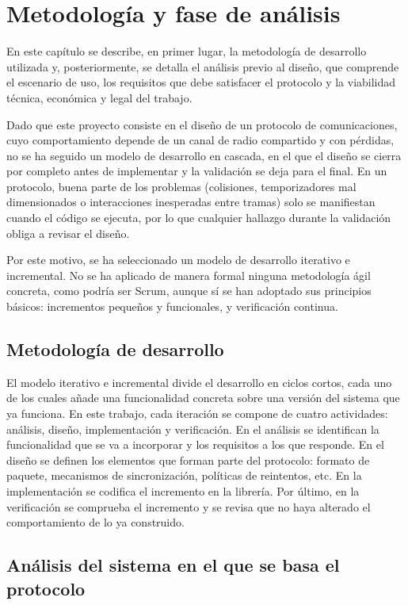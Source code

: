 \chapter{Metodología y fase de análisis}\label{chap:3}

En este capítulo se describe, en primer lugar, la metodología de desarrollo utilizada y, posteriormente, se detalla el análisis previo al diseño, que comprende el escenario de uso, los requisitos que debe satisfacer el protocolo y la viabilidad técnica, económica y legal del trabajo.

Dado que este proyecto consiste en el diseño de un protocolo de comunicaciones, cuyo comportamiento depende de un canal de radio compartido y con pérdidas, no se ha seguido un modelo de desarrollo en cascada, en el que el diseño se cierra por completo antes de implementar y la validación se deja para el final. En un protocolo, buena parte de los problemas (colisiones, temporizadores mal dimensionados o interacciones inesperadas entre tramas) solo se manifiestan cuando el código se ejecuta, por lo que cualquier hallazgo durante la validación obliga a revisar el diseño.

Por este motivo, se ha seleccionado un modelo de desarrollo iterativo e incremental. No se ha aplicado de manera formal ninguna metodología ágil concreta, como podría ser Scrum, aunque sí se han adoptado sus principios básicos: incrementos pequeños y funcionales, y verificación continua.

\section{Metodología de desarrollo}\label{sec:metodologia}

El modelo iterativo e incremental divide el desarrollo en ciclos cortos, cada uno de los cuales añade una funcionalidad concreta sobre una versión del sistema que ya funciona. En este trabajo, cada iteración se compone de cuatro actividades: análisis, diseño, implementación y verificación. En el análisis se identifican la funcionalidad que se va a incorporar y los requisitos a los que responde. En el diseño se definen los elementos que forman parte del protocolo: formato de paquete, mecanismos de sincronización, políticas de reintentos, etc. En la implementación se codifica el incremento en la librería. Por último, en la verificación se comprueba el incremento y se revisa que no haya alterado el comportamiento de lo ya construido.

\section{Análisis del sistema en el que se basa el protocolo}\label{sec:escenario}


